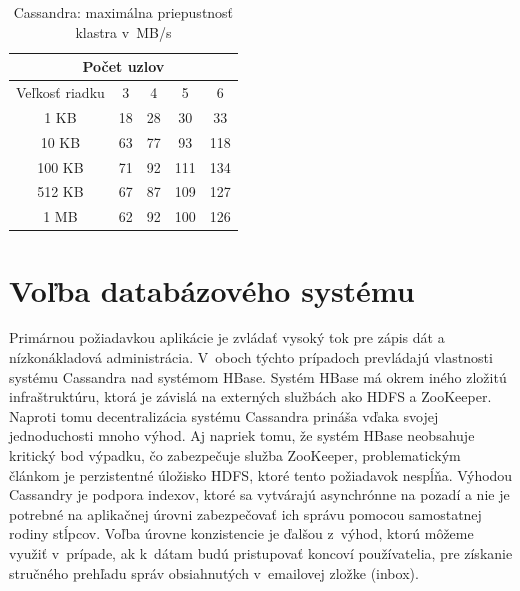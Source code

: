 \documentclass[11pt,twoside,a4paper]{book}
\begin{document}
\begin{table}[htp]
\begin{center}
\begin{tabular}{|c|c|c|c|c|}
\hline
\multicolumn{5}{|c|}{Počet uzlov}  \\
\hline Veľkosť riadku & 3 & 4 & 5 & 6\\ 
\hline
\hline 1 KB & 18 & 28 & 30 & 33\\ 
\hline 10 KB & 63 & 77 & 93 & 118 \\ 
\hline 100 KB & 71 & 92 & 111 & 134\\ 
\hline 512 KB & 67 & 87 & 109 & 127\\  
\hline 1 MB & 62 & 92 & 100 & 126\\ 
\hline
\end{tabular} 
\end{center}
\caption{Cassandra: maximálna priepustnosť klastra v~MB/s}
\label{tab:CPerf1}
\end{table}





\section{Voľba databázového systému}

Primárnou požiadavkou aplikácie je zvládať vysoký tok pre zápis dát a nízkonákladová administrácia. V~oboch týchto prípadoch prevládajú vlastnosti systému Cassandra nad systémom HBase. Systém HBase má okrem iného zložitú infraštruktúru, ktorá je závislá na externých službách ako HDFS a ZooKeeper. Naproti tomu decentralizácia systému Cassandra prináša vďaka svojej jednoduchosti mnoho výhod. Aj napriek tomu, že systém HBase neobsahuje kritický bod výpadku, čo zabezpečuje služba ZooKeeper, problematickým článkom je perzistentné úložisko HDFS, ktoré tento požiadavok nespĺňa. Výhodou Cassandry je podpora indexov, ktoré sa vytvárajú asynchrónne na pozadí a nie je potrebné na aplikačnej úrovni zabezpečovať ich správu pomocou samostatnej rodiny stĺpcov. Voľba úrovne konzistencie je ďalšou z~výhod, ktorú môžeme využiť v~prípade, ak k~dátam budú pristupovať koncoví používatelia, pre získanie stručného prehľadu správ obsiahnutých v~emailovej zložke (inbox).
\end{document}
